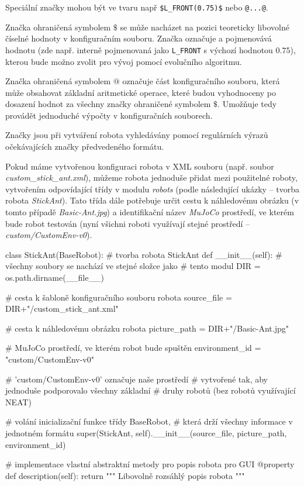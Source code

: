 Speciální značky mohou být ve tvaru např \texttt{\$L\_FRONT(0.75)\$} nebo
\texttt{@...@}. 

Značka ohraničená symbolem $\$$ se může nacházet na pozici teoreticky libovolné
číselné hodnoty v konfiguračním souboru. Značka označuje a pojmenovává hodnotu
(zde např. interně pojmenovaná jako \texttt{L\_FRONT} s výchozí hodnotou
$0.75$), kterou bude možno zvolit pro vývoj pomocí evolučního algoritmu. 

Značka ohraničená symbolem $@$ označuje část konfiguračního souboru, která může
obsahovat základní aritmetické operace, které budou vyhodnoceny po dosazení
hodnot za všechny značky ohraničené symbolem $\$$. Umožňuje tedy provádět
jednoduché výpočty v konfiguračních souborech.

Značky jsou při vytváření robota vyhledávány pomocí regulárních výrazů
očekávajících značky předvedeného formátu.

Pokud máme vytvořenou konfiguraci robota v XML souboru (např. soubor
\emph{custom\_stick\_ant.xml}), můžeme robota jednoduše přidat mezi použitelné
roboty, vytvořením odpovídající třídy v modulu \emph{robots} (podle následující
ukázky -- tvorba robota \emph{StickAnt}). Tato třída dále potřebuje určit cestu
k náhledovému obrázku (v tomto případě \emph{Basic-Ant.jpg}) a identifikační
název \emph{MuJoCo} prostředí, ve kterém bude robot testován (nyní všichni
roboti využívají stejné prostředí -- \emph{custom/CustomEnv-v0}).

\begin{code}
class StickAnt(BaseRobot): # tvorba robota StickAnt
    def __init__(self):
        # všechny soubory se nachází ve stejné složce jako 
        # tento modul
        DIR = os.path.dirname(__file__)

        # cesta k šabloně konfiguračního souboru robota
        source_file = DIR+"/custom_stick_ant.xml"

        # cesta k náhledovému obrázku robota
        picture_path = DIR+"/Basic-Ant.jpg"


        # MuJoCo prostředí, ve kterém robot bude spuštěn
        environment_id = "custom/CustomEnv-v0"

        # 'custom/CustomEnv-v0' označuje naše prostředí 
        # vytvořené tak, aby jednoduše podporovalo všechny základní 
        # druhy robotů (bez robotů využívající NEAT)

        # volání inicializační funkce třídy BaseRobot,
        # která drží všechny informace v jednotném formátu
        super(StickAnt, self).__init__(source_file, 
                                       picture_path, 
                                       environment_id)

    # implementace vlastní abstraktní metody pro popis robota pro GUI
    @property
    def description(self):
        return """ Libovolně rozsáhlý popis robota """
\end{code}

